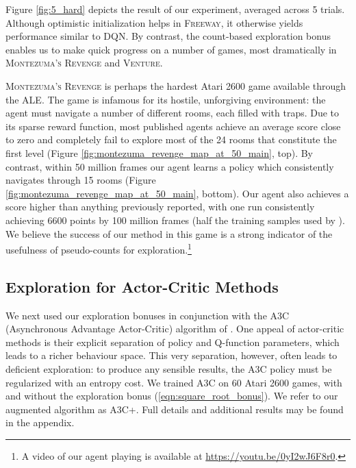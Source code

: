 \documentclass{article}
\newcommand{\eqnref}[1]{(\ref{eqn:#1})}
\newcommand{\gamename}[1]{\textsc{#1}}
\begin{document}
Figure \ref{fig:5_hard} depicts the result of our experiment, averaged across 5 trials.
Although optimistic initialization helps in \gamename{Freeway}, it otherwise yields performance
similar to DQN. By contrast, the count-based exploration bonus enables us to make quick progress
on a number of games, most dramatically in \gamename{Montezuma's Revenge} and \gamename{Venture}. 

\gamename{Montezuma's Revenge} is perhaps the hardest Atari 2600 game available
through the ALE. The game is infamous for its hostile, unforgiving
environment: the agent must navigate a number of different rooms, each filled with traps.
Due to its sparse reward function, most published agents achieve an average score close to zero and completely fail to explore most of the 24 rooms that constitute the first level (Figure \ref{fig:montezuma_revenge_map_at_50_main}, top).
By contrast, within 50 million frames our agent learns a policy which consistently navigates
through 15 rooms (Figure \ref{fig:montezuma_revenge_map_at_50_main}, bottom). Our agent also achieves a score higher than anything previously reported, with one run consistently achieving 6600 points by 100 million frames (half the training samples used by \citet{mnih15human}). We believe the success of our method in this game is a strong indicator of the 
usefulness of pseudo-counts for exploration.\footnote{A video of our agent playing is available at \url{https://youtu.be/0yI2wJ6F8r0}.} 

\begin{figure*}
\caption{``Known world'' of a DQN agent trained for 50 million frames with (\textbf{right}) and without (\textbf{left}) count-based exploration bonuses, in \gamename{Montezuma's Revenge}.\label{fig:montezuma_revenge_map_at_50_main}}
\end{figure*}

\subsection{Exploration for Actor-Critic Methods}

We next used our exploration bonuses in conjunction with the A3C 
(Asynchronous Advantage Actor-Critic) algorithm of \citet{mnih16asynchronous}. One appeal of
actor-critic methods is their explicit separation of policy and Q-function parameters, which leads to a richer behaviour space. This very separation, however, often leads to deficient exploration: to produce
any sensible results, the A3C policy must be regularized with an entropy cost.
We trained A3C on 60 Atari 2600 games, with and without the exploration bonus \eqnref{square_root_bonus}. We refer to our augmented algorithm as A3C+. Full details and additional results may be found in the appendix. 
\end{document}
